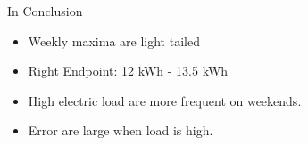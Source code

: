 \documentclass[notes]{beamer}
\begin{document}
\begin{frame}{In Conclusion}
\begin{itemize}
\item Weekly maxima are light tailed
\item Right Endpoint: 12 kWh - 13.5 kWh
\item High electric load are more frequent on weekends.
\item Error are large when load is high.
\end{itemize}

\end{frame}

\end{document}
